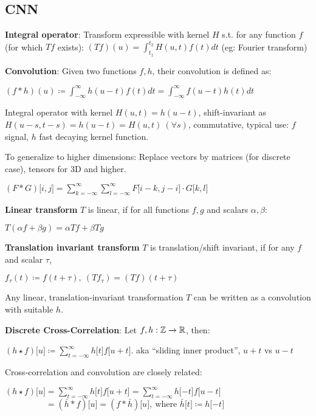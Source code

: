 \subsection{CNN}
\label{sub:cnn}
    \textbf{Integral operator}: Transform expressible with kernel $H$ s.t. for any function $f$ (for which $Tf$ exists): $(Tf)(u)=\int^{t_2}_{t_1}H(u,t)f(t)dt$ (eg: Fourier transform)
    
    \textbf{Convolution}: Given two functions $f,h$, their convolution is defined as:
    
    \tab $(f*h)(u)\coloneqq\int_{-\infty}^{\infty}h(u-t)f(t)dt=\int_{-\infty}^{\infty}f(u-t)h(t)dt $
    
    Integral operator with kernel $H(u,t)=h(u-t)$, shift-invariant as $H(u-s,t-s)=h(u-t)=H(u,t)\>(\forall s)$, commutative, typical use: $f$ signal, $h$ fast decaying kernel function.
    
    To generalize to higher dimensions: Replace vectors by matrices (for discrete case), tensors for 3D and higher.
    
    \tab $(F*G)\lbrack i,j \rbrack = \sum^\infty_{k=-\infty}\sum^\infty_{l=-\infty}F\lbrack i-k, j-i \rbrack \cdot G\lbrack k,l \rbrack$
    
    \textbf{Linear transform} $T$ is linear, if for all functions $f,g$ and scalars $\alpha,\beta$: 
    
    \tab$T(\alpha f+\beta g)=\alpha Tf+\beta Tg$
    
    \textbf{Translation invariant transform} $T$ is translation/shift invariant, if for any $f$ and scalar $\tau$,
    
    \tab$f_\tau(t)\coloneqq f(t+\tau),\>(Tf_\tau)=(Tf)(t+\tau)$
    
    Any linear, translation-invariant transformation $T$ can be written as a convolution with suitable $h$.
    
    \textbf{Discrete Cross-Correlation}: Let $f,h:\mathbb{Z}\xrightarrow{}\mathbb R$, then:
    
    \tab$(h\star f)\lbrack u \rbrack\coloneqq\sum\limits^\infty_{t=-\infty}h\lbrack t \rbrack f \lbrack u+t \rbrack$. aka ``sliding inner product'', $u+t$ vs $u-t$
    
    Cross-correlation and convolution are closely related:
    
    \tab$(h\star f)\lbrack u \rbrack=\sum\limits^\infty_{t=-\infty}h\lbrack t \rbrack f \lbrack u+t \rbrack=\sum\limits^\infty_{t=-\infty}h\lbrack -t \rbrack f \lbrack u-t \rbrack$\\
    \tab$\phantom{(h\star f)\lbrack u \rbrack}=(\bar{h}*f)\lbrack u \rbrack=(f*\bar{h})\lbrack u \rbrack,\>\text{where } \bar{h}\lbrack t \rbrack\coloneqq h\lbrack -t\rbrack$
    
